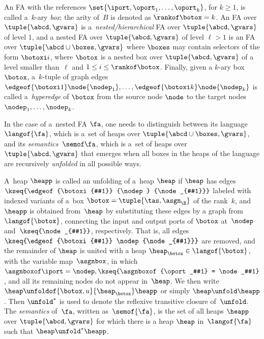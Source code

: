 An FA with the references $\set{\iport,\oport_1,\ldots,\oport_k}$, for $k \geq 1$, is called a~$k$-ary \emph{box}; 
the arity of~$B$ is denoted as $\rankof\botox = k$.
%
An FA over $\tuple{\abcd, \gvars}$ is a~\emph{nested/hierarchical} FA over $\tuple{\abcd, \gvars}$ of level $1$,
%
and a nested FA over $\tuple{\abcd, \gvars}$ of level $\ell>1$ 
is an FA over $\tuple{\abcd\cup\boxes, \gvars}$ where $\boxes$ may contain
selectors of the form $\botoxi i$, where $\botox$ is a nested box over
$\tuple{\abcd, \gvars}$ of a level smaller than~$\ell$ and $1\leq i \leq \rankof\botox$. 
%
Finally, given a $k$-ary box $\botox$, a~$k$-tuple of graph edges $\edgeof {\botoxi 1} \node {\nodep_1},\ldots,\edgeof {\botoxi k} \node {\nodep_k}$ is called  a~\emph{hyperedge} of $\botox$ from the source node $\node$ to the target nodes 
$\nodep_1,\ldots,\nodep_k$.
%

In the case of a~nested FA $\fa$, one needs to distinguish between its
language~$\langof{\fa}$, which is a~set of heaps over $\tuple{\abcd \cup \boxes,
\gvars}$, and its \emph{semantics}~$\semof \fa$, which is a~set of heaps over
$\tuple{\abcd, \gvars}$ that emerges when all boxes in the heaps of the
language are recursively \emph{unfolded} in all possible ways.
%


A~heap $\heapp$ is called an unfolding of a~heap $\heap$
if $\heap$ has edges 
$\kseq{\edgeof{\botoxi{#1}} {\nodep} {\node_{#1}}}$
labeled with indexed variants of a~box 
$\botox = \tuple{\tas, \asgn_\B}$ of the rank~$k$, 
and~$\heapp$ is obtained from~$\heap$ by substituting these edges by a graph
from $\langof{\botox}$, connecting the input and output ports of $\botox$
at~$\nodep$ and~$\kseq{\node_{#1}}$, 
respectively. 
That is, all edges 
$\kseq{\edgeof {\botoxi{#1}} \nodep {\node_{#1}}}$ 
are removed, 
and the remainder of $\heap$ is united with a heap $\heap_\botox\in
\langof{\botox}$, with the variable map~$\asgnbox$,
in which
$\asgnboxof \iport = \nodep,\kseq{\asgnboxof {\oport_#1} = \node_#1}$, 
and all its remaining nodes do not appear in~$\heap$.
We then write $\heap \unfoldof{\botox,u}{\heap_{\botox}} \heapp$ 
or simply $\heap\unfold\heapp$. 
Then $\unfold^{*}$ is used to denote the reflexive transitive
closure of~$\unfold$.
The \emph{semantics} of~$\fa$, written as~$\semof{\fa}$,
is the set of all heaps $\heapp$ over $\tuple{\abcd, \gvars}$ for which
there is a heap $\heap$ in~$\langof{\fa}$ such that $\heap \unfold^{*}
\heapp$.




